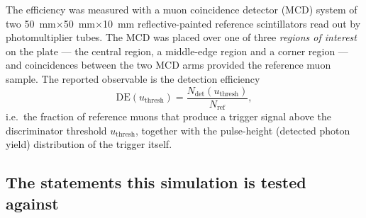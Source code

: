 \documentclass[11pt,a4paper]{article}
\begin{document}
The efficiency was measured with a muon coincidence detector (MCD) system of
two \SI{50}{\milli\meter}$\times$\SI{50}{\milli\meter}$\times$\SI{10}{\milli\meter}
reflective-painted reference scintillators read out by photomultiplier
tubes. The MCD was placed over one of three \emph{regions of interest} on
the plate --- the central region, a middle-edge region and a corner region
--- and coincidences between the two MCD arms provided the reference muon
sample. The reported observable is the detection efficiency
\begin{equation}
  \mathrm{DE}(u_{\mathrm{thresh}})
  = \frac{N_{\mathrm{det}}(u_{\mathrm{thresh}})}{N_{\mathrm{ref}}},
  \label{eq:de}
\end{equation}
i.e.\ the fraction of reference muons that produce a trigger signal above the
discriminator threshold $u_{\mathrm{thresh}}$, together with the pulse-height
(detected photon yield) distribution of the trigger itself.

\subsection{The statements this simulation is tested against}
\end{document}
